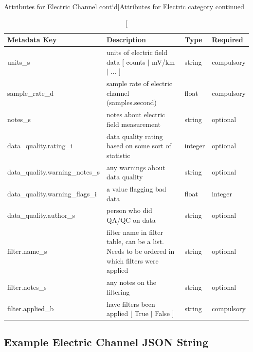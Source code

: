 \documentclass{article}
\begin{document}
\newpage
\begin{table}[htb!]
	\caption[Attributes for Electric Channel cont`d]{Attributes for Electric category continued}
	\begin{tabular}{|l|p{3in}|l|l|}
		\hline
		\textbf{Metadata Key} & \textbf{Description} & \textbf{Type} & \textbf{Required} \\ \hline
		units\_s & units of electric field data [ counts $|$ mV/km $|$ ... ] & string & compulsory \\ \hline
		sample\_rate\_d & sample rate of electric channel (samples.second) & float & compulsory \\ \hline
		notes\_s & notes about electric field measurement & string &  optional \\ \hline
		data\_quality.rating\_i & data quality rating based on some sort of statistic & integer & optional \\ \hline
		data\_quality.warning\_notes\_s & any warnings about data quality & string & optional \\ \hline
		data\_quality.warning\_flags\_i & a value flagging bad data  & float &  integer \\ \hline
		data\_quality.author\_s & person who did QA/QC on data & string &  optional \\ \hline
		filter.name\_s & filter name in filter table, can be a list. Needs to be ordered in which filters were applied & string &  optional \\ \hline
		filter.notes\_s & any notes on the filtering & string &  optional \\ \hline
		filter.applied\_b & have filters been applied [ True $|$ False ] & string & compulsory \\ \hline
		\end{tabular}
		\label{tab:electric02}
\end{table}	

\newpage
\subsection{Example Electric Channel JSON String}
\end{document}
